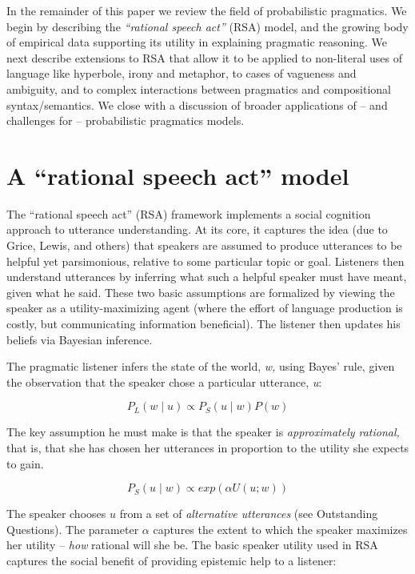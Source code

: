 \documentclass[]{elsarticle}
\begin{document}
In the remainder of this paper we review the field of probabilistic
pragmatics. We begin by describing the \emph{``rational speech act''}
(RSA) model, and the growing body of empirical data supporting its
utility in explaining pragmatic reasoning. We next describe extensions
to RSA that allow it to be applied to non-literal uses of language like
hyperbole, irony and metaphor, to cases of vagueness and ambiguity, and
to complex interactions between pragmatics and compositional
syntax/semantics. We close with a discussion of broader applications of
-- and challenges for -- probabilistic pragmatics models.

\section{A ``rational speech act'' model}\label{a-rational-speech-act-model}

The ``rational speech act'' (RSA) framework implements a social
cognition approach to utterance understanding. At its core, it captures
the idea (due to Grice, Lewis, and others) that speakers are assumed to
produce utterances to be helpful yet parsimonious, relative to some
particular topic or goal. Listeners then understand utterances by
inferring what such a helpful speaker must have meant, given what he
said. These two basic assumptions are formalized by viewing the speaker
as a utility-maximizing agent (where the effort of language production
is costly, but communicating information beneficial). The listener then
updates his beliefs via Bayesian inference.

The pragmatic listener infers the state of the world, \emph{w,} using
Bayes' rule, given the observation that the speaker chose a particular
utterance, \emph{u}:

$$P_L(w\mid u) \propto P_S(u \mid w)P(w)$$

The key assumption he must make is that the speaker is
\emph{approximately rational,} that is, that she has chosen her
utterances in proportion to the utility she expects to gain.

$$P_S(u\mid w) \propto exp(\alpha
U(u;w))$$

The speaker chooses $u$ from a set of \emph{alternative utterances}
(see Outstanding Questions). The parameter $\alpha$
captures the extent to which the speaker maximizes her utility --
\emph{how} rational will she be. The basic speaker utility used in RSA
captures the social benefit of providing epistemic help to a listener:
\end{document}
